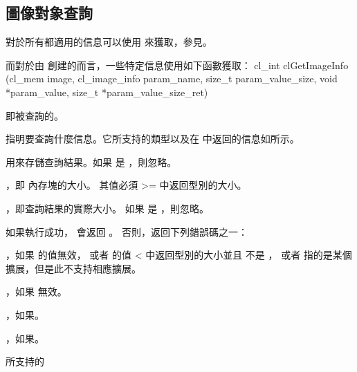 \subsection{圖像對象查詢}

對於所有都適用的信息可以使用  來獲取，參見。

而對於由  創建的而言，一些特定信息使用如下函數獲取：
\startclc
cl_int clGetImageInfo (cl_mem image,
			cl_image_info param_name,
			size_t param_value_size,
			void *param_value,
			size_t *param_value_size_ret)
\stopclc

 即被查詢的。

 指明要查詢什麼信息。它所支持的類型以及在  中返回的信息如所示。

 用來存儲查詢結果。如果  是 ，則忽略。

，即  內存塊的大小。
其值必須 >= 中返回型別的大小。

，即查詢結果的實際大小。
如果  是 ，則忽略。

如果執行成功，  會返回 。
否則，返回下列錯誤碼之一：
\startigBase
\item {}，如果  的值無效，
或者  的值 < 中返回型別的大小並且  不是 ，
或者  指的是某個擴展，但是此不支持相應擴展。

\item {}，如果  無效。

\item {}，如果\scdevfailres。
\item {}，如果\schostfailres。
\stopigBase

\startbuffer[tblclgetimginfo]
 所支持的 
\stopbuffer

